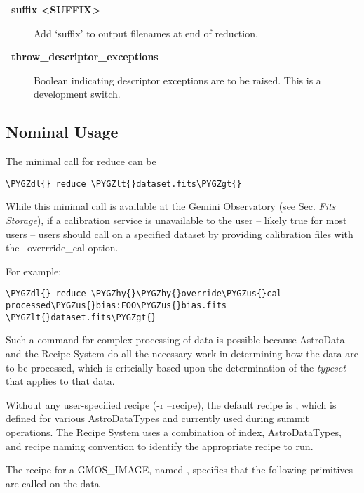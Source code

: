 \documentclass[letterpaper,10pt,english]{sphinxmanual}
\def\PYGZus{\char`\_}
\def\PYGZlt{\char`\<}
\def\PYGZgt{\char`\>}
\def\PYGZdl{\char`\$}
\def\PYGZhy{\char`\-}
\begin{document}
\begin{description}
\item[{\textbf{--suffix \textless{}SUFFIX\textgreater{}}}] \leavevmode
Add `suffix' to output filenames at end of reduction.

\item[{\textbf{--throw\_descriptor\_exceptions}}] \leavevmode
Boolean indicating descriptor exceptions are to be raised. This is a
development switch.

\end{description}


\subsection{Nominal Usage}
\label{interfaces:nominal-usage}
The minimal call for reduce can be

\begin{Verbatim}[commandchars=\\\{\}]
\PYGZdl{} reduce \PYGZlt{}dataset.fits\PYGZgt{}
\end{Verbatim}

While this minimal call is available at the Gemini Observatory (see Sec.
{\hyperref[discuss:fitsstore]{\emph{Fits Storage}}}), if a calibration service is unavailable to the user --
likely true for most users -- users should call  on a specified
dataset by providing calibration files with the  --overrride\_cal option.

For example:

\begin{Verbatim}[commandchars=\\\{\}]
\PYGZdl{} reduce \PYGZhy{}\PYGZhy{}override\PYGZus{}cal processed\PYGZus{}bias:FOO\PYGZus{}bias.fits \PYGZlt{}dataset.fits\PYGZgt{}
\end{Verbatim}

Such a command for complex processing of data is possible because AstroData
and the Recipe System do all the necessary work in determining how the data are to
be processed, which is critcially based upon the determination of the \emph{typeset}
that applies to that data.

Without any user-specified recipe (-r --recipe), the default recipe is
, which is defined for various AstroDataTypes and currently used
during summit operations. The Recipe System uses a combination of index,
AstroDataTypes, and recipe naming convention to identify the appropriate
recipe to run.

The  recipe for a GMOS\_IMAGE, named ,
specifies that the following primitives are called on the data
\end{document}
